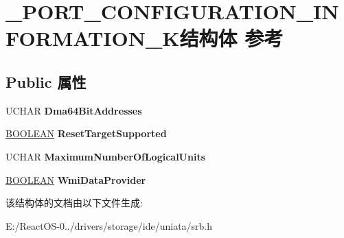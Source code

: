 \hypertarget{struct___p_o_r_t___c_o_n_f_i_g_u_r_a_t_i_o_n___i_n_f_o_r_m_a_t_i_o_n__2_k}{}\section{\+\_\+\+P\+O\+R\+T\+\_\+\+C\+O\+N\+F\+I\+G\+U\+R\+A\+T\+I\+O\+N\+\_\+\+I\+N\+F\+O\+R\+M\+A\+T\+I\+O\+N\+\_\+K结构体 参考}
\label{struct___p_o_r_t___c_o_n_f_i_g_u_r_a_t_i_o_n___i_n_f_o_r_m_a_t_i_o_n__2_k}
\subsection*{Public 属性}
\begin{DoxyCompactItemize}
\item 
\mbox{\label{struct___p_o_r_t___c_o_n_f_i_g_u_r_a_t_i_o_n___i_n_f_o_r_m_a_t_i_o_n__2_k_a4db19582a597b682af7a1281300a83dc}} 
U\+C\+H\+AR {\bfseries Dma64\+Bit\+Addresses}
\item 
\mbox{\label{struct___p_o_r_t___c_o_n_f_i_g_u_r_a_t_i_o_n___i_n_f_o_r_m_a_t_i_o_n__2_k_aeab3356520c4071056f13da4b7ed8c2e}} 
\hyperlink{_processor_bind_8h_a112e3146cb38b6ee95e64d85842e380a}{B\+O\+O\+L\+E\+AN} {\bfseries Reset\+Target\+Supported}
\item 
\mbox{\label{struct___p_o_r_t___c_o_n_f_i_g_u_r_a_t_i_o_n___i_n_f_o_r_m_a_t_i_o_n__2_k_a56a64ddd1834b7875c6e651281cb37b1}} 
U\+C\+H\+AR {\bfseries Maximum\+Number\+Of\+Logical\+Units}
\item 
\mbox{\label{struct___p_o_r_t___c_o_n_f_i_g_u_r_a_t_i_o_n___i_n_f_o_r_m_a_t_i_o_n__2_k_a2a08bc234d015e75d59d6026fb718ed1}} 
\hyperlink{_processor_bind_8h_a112e3146cb38b6ee95e64d85842e380a}{B\+O\+O\+L\+E\+AN} {\bfseries Wmi\+Data\+Provider}
\end{DoxyCompactItemize}


该结构体的文档由以下文件生成\+:\begin{DoxyCompactItemize}
\item 
E\+:/\+React\+O\+S-\/0../drivers/storage/ide/uniata/srb.\+h\end{DoxyCompactItemize}
